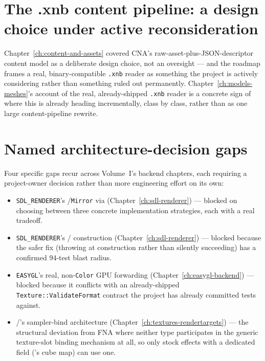 \section{The .xnb content pipeline: a design choice under active reconsideration}

Chapter~\ref{ch:content-and-assets} covered CNA's raw-asset-plus-JSON-descriptor content
model as a deliberate design choice, not an oversight --- and the roadmap frames a real,
binary-compatible \texttt{.xnb} reader as something the project is actively considering
rather than something ruled out permanently. Chapter~\ref{ch:models-meshes}'s account of the
real, already-shipped \texttt{.xnb}  reader is a concrete sign of where this
is already heading incrementally, class by class, rather than as one large content-pipeline
rewrite.

\section{Named architecture-decision gaps}

Four specific gaps recur across Volume~I's backend chapters, each requiring a project-owner
decision rather than more engineering effort on its own:

\begin{itemize}
  \item \texttt{SDL\_RENDERER}'s /\texttt{Mirror} via
         (Chapter~\ref{ch:sdl-renderer}) --- blocked on choosing between
        three concrete implementation strategies, each with a real tradeoff.
  \item \texttt{SDL\_RENDERER}'s / construction
        (Chapter~\ref{ch:sdl-renderer}) --- blocked because the safer fix (throwing at
        construction rather than silently succeeding) has a confirmed 94-test blast radius.
  \item \texttt{EASYGL}'s real, non-\texttt{Color}  GPU forwarding
        (Chapter~\ref{ch:easygl-backend}) --- blocked because it conflicts with an
        already-shipped \texttt{Texture::ValidateFormat} contract the project has already
        committed tests against.
  \item {}/'s sampler-bind architecture
        (Chapter~\ref{ch:textures-rendertargets}) --- the structural deviation from FNA
        where neither type participates in the generic texture-slot binding mechanism at
        all, so only stock effects with a dedicated field ('s
        cube map) can use one.
\end{itemize}


